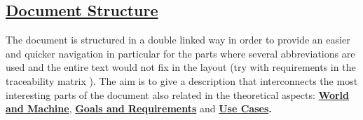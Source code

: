 \subsection[Document Structure]{\hyperlink{toc}{Document Structure}}
	The document is structured in a double linked way in order to provide an easier and quicker navigation in particular for the parts where several abbreviations are used and the entire text would not fix in the layout (try with requirements in the traceability matrix ). The aim is to give a description that interconnects the most interesting parts of the document also related in the theoretical aspects: \textbf{\hyperref[sec:worldMachine]{World and Machine}},
	\textbf{\hyperref[sec:goalSatisfaction]{Goals and Requirements}}  and \textbf{\hyperref[sec:useCases]{Use Cases}.}\\
	
